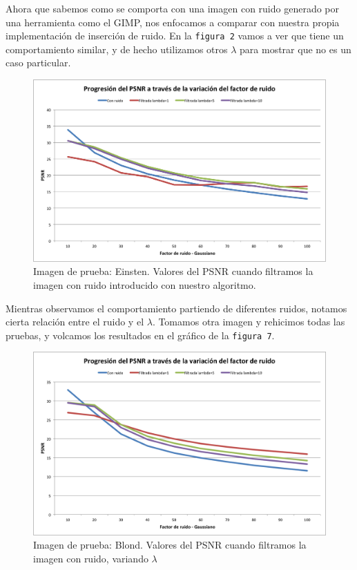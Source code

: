 \documentclass[a4paper]{article}
\begin{document}
Ahora que sabemos como se comporta con una imagen con ruido generado por una herramienta como el GIMP, nos enfocamos a comparar con nuestra propia implementación de inserción de ruido.
En la \texttt{figura 2} vamos a ver que tiene un comportamiento similar, y de hecho utilizamos otros $\lambda$ para mostrar que no es un caso particular. 
\begin{figure}[H]
  \centering
  \includegraphics[scale=0.65]{graficos/PSNR_Einstein.png}
  \caption{ Imagen de prueba: Einsten. Valores del PSNR cuando filtramos la imagen con ruido introducido con nuestro algoritmo. }
\end{figure}

Mientras observamos el comportamiento partiendo de diferentes ruidos, notamos cierta relación entre el ruido y el $\lambda$.
Tomamos otra imagen y rehicimos todas las pruebas, y volcamos los resultados en el gráfico de la \texttt{figura 7}. 

\begin{figure}[H]
  \centering
  \includegraphics[scale=0.65]{graficos/PSNR_Blond.png}
  \caption{ Imagen de prueba: Blond. Valores del PSNR cuando filtramos la imagen con ruido, variando $\lambda$}
\end{figure}
\end{document}
